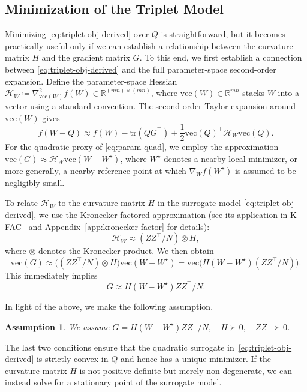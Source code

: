 \documentclass[11pt]{article}
\newtheorem{assumption}{Assumption}
\newcommand{\R}{\mathbb{R}}
\newcommand{\vecop}{\mathrm{vec}}
\begin{document}
\subsection{Minimization of the Triplet Model}
\label{subsec:triplet-induced}

Minimizing \eqref{eq:triplet-obj-derived} over $Q$ is straightforward, but it becomes practically useful only if we can establish a relationship between the curvature matrix $H$ and the gradient matrix $G$. To this end, we first establish a connection between \eqref{eq:triplet-obj-derived} and the full parameter-space second-order expansion. Define the parameter-space Hessian
${\mathcal{H}}_{{W}} \coloneqq \nabla^2_{\vecop({W})} f({W}) \in \R^{(mn)\times(mn)}$,
where $\vecop({W})\in\R^{mn}$ stacks ${W}$ into a vector using a standard convention. The second-order Taylor expansion around $\vecop({W})$ gives
\begin{equation}\label{eq:param-quad}
  f({W} - {Q})
   \approx 
  f({W})
  - \mathrm{tr}(QG^\top)
  + \frac{1}{2} \vecop({Q})^\top {\mathcal{H}}_{{W}} \vecop({Q}).
\end{equation}
For the quadratic proxy of \eqref{eq:param-quad}, we employ the approximation $\vecop({G}) \approx {\mathcal{H}}_{{W}} \vecop({W}-W^\star)$, where $W^\star$ denotes a nearby local minimizer, or more generally, a nearby reference point at which $\nabla_W f(W^\star)$ is assumed to be negligibly small.

To relate $\mathcal{H}_W$ to the curvature matrix $H$ in the surrogate model \eqref{eq:triplet-obj-derived}, we use the Kronecker-factored approximation (see its application in K-FAC~\citep{martens2015optimizing} and Appendix~\ref{app:kronecker-factor} for details):
\begin{equation}\label{eq:HW-kron}
  {\mathcal{H}}_{{W}}
  \approx
  ({Z}{Z}^\top/N)\otimes {H},
\end{equation}
where $\otimes$ denotes the Kronecker product. We then obtain 
\[
  \vecop({G})
  \approx
  \big(({Z}{Z}^\top/N)\otimes {H}\big)\vecop({W}-W^\star)
  =
  \vecop\Big({H} ({W}-W^\star) ({Z}{Z}^\top/N)\Big).
\]
This immediately implies
\[
G \approx H ({W}-W^\star) {Z}{Z}^\top/N.
\]

In light of the above, we make the following assumption.
\begin{assumption}
\label{assump:exact-newton}
We assume ${G}={H} ({W}-W^\star) {Z}{Z}^\top/N, \quad {H}\succ 0,\quad {Z}{Z}^\top\succ 0$.
\end{assumption}
The last two conditions ensure that the quadratic surrogate in~\eqref{eq:triplet-obj-derived} is strictly convex in ${Q}$ and hence has a unique minimizer. If the curvature matrix $H$ is not positive definite but merely non-degenerate, we can instead solve for a stationary point of the surrogate model.
\end{document}
